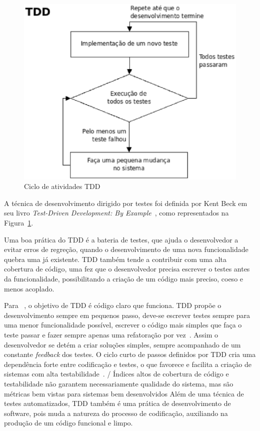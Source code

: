 \begin{figure}[h]
    \centering
    \includegraphics[keepaspectratio=true,scale=0.50]
      {figuras/tdd_ciclo.eps}
    \caption{Ciclo de atividades TDD~\cite{beck2002}}
    \label{tdd_ciclo}
\end{figure}

A técnica de desenvolvimento dirigido por testes foi definida por Kent Beck em seu 
livro \textit{Test-Driven Development: By Example}~, como
representados na Figura~\ref{tdd_ciclo}.

Uma boa prática do TDD é a bateria de testes, que ajuda o desenvolvedor a evitar 
erros de regreção, quando o desenvolvimento de uma nova funcionalidade quebra uma 
já existente.
%
TDD também tende a contribuir com uma alta cobertura de código, uma 
fez que o desenvolvedor precisa escrever o testes antes da funcionalidade, 
possibilitando a criação de um código mais preciso, coeso e menos acoplado. 

Para ~, o objetivo de TDD é código claro que 
funciona.
%
TDD propõe o desenvolvimento sempre em pequenos passo, deve-se escrever testes sempre 
para uma menor funcionalidade possível, escrever o código mais simples que faça o 
teste passar e fazer sempre apenas uma refatoração por vez~. Assim o 
desenvolvedor se detém a criar soluções simples, sempre acompanhado de um constante 
\textit{feedback} dos testes.
%
O ciclo curto de passos definidos por TDD cria uma dependência forte entre codificação 
e testes, o que favorece e facilita a criação de sistemas com alta testabilidade~\cite{bernardo2011}. 
/%
Índices altos de cobertura de código e testabilidade não garantem necessariamente 
qualidade do sistema, mas são métricas bem vistas para sistemas bem desenvolvidos
%
Além de uma técnica de testes automatizados, TDD também é uma prática de desenvolvimento 
de software, pois muda a natureza do processo de codificação, auxiliando na produção 
de um código funcional e limpo.
%

